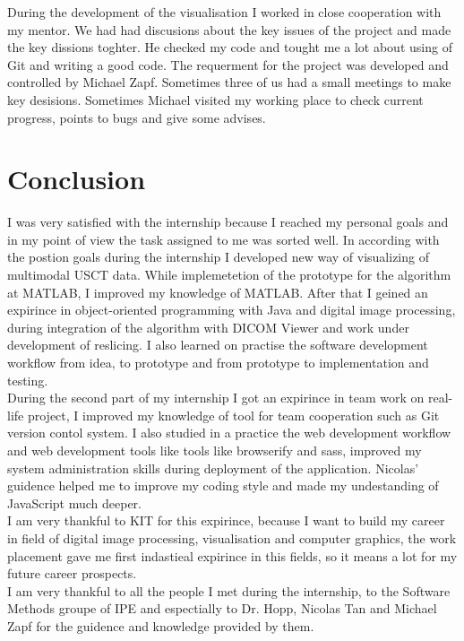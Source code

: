 \documentclass[english]{article}
\begin{document}
During the development of the visualisation I worked in close cooperation with my mentor. We had had discusions about the key issues of the project and made the key dissions toghter. He checked my code and tought me a lot about using of Git and writing a good code. The requerment for the project was developed and controlled by Michael Zapf. Sometimes three of us had a small meetings to make key desisions. Sometimes Michael visited my working place to check current progress, points to bugs and give some advises. 

\section{Conclusion}

I was very satisfied with the internship because I reached my personal goals and in my point of view the task assigned to me was sorted well. In according with the postion goals during the internship I developed new way of visualizing of multimodal USCT data. While implemetetion of the prototype for the algorithm at MATLAB, I improved my knowledge of MATLAB. After that I geined an expirince in object-oriented programming with Java and digital image processing, during integration of the algorithm with DICOM Viewer and work under development of reslicing. I also learned on practise the software development workflow from idea, to prototype and from prototype to implementation and testing.\\

During the second part of my internship I got an expirince in team work on real-life project, I improved my knowledge of tool for team cooperation such as Git version contol system. I also studied in a practice the web development workflow and web development tools like tools like browserify and sass, improved my system administration skills during deployment of the application. Nicolas' guidence helped me to improve my coding style and made my undestanding of JavaScript much deeper.\\

I am very thankful to KIT for this expirince, because I want to build my career in field of digital image processing, visualisation and computer graphics, the work placement gave me first indastieal expirince in this fields, so it means a lot for my future career prospects.\\

I am very thankful to all the people I met during the internship, to the Software Methods groupe of IPE and espectially to Dr. Hopp, Nicolas Tan and Michael Zapf for the guidence and knowledge provided by them.
\end{document}
